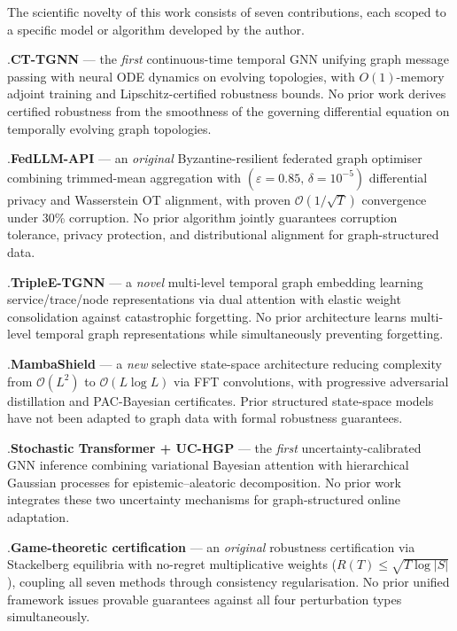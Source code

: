 The scientific novelty of this work consists of seven contributions, each scoped to a specific model or algorithm developed by the author.

.\quad \textbf{CT-TGNN} --- the \emph{first} continuous-time temporal GNN unifying graph message passing with neural ODE dynamics on evolving topologies, with $O(1)$-memory adjoint training and Lipschitz-certified robustness bounds. No prior work derives certified robustness from the smoothness of the governing differential equation on temporally evolving graph topologies.

.\quad \textbf{FedLLM-API} --- an \emph{original} Byzantine-resilient federated graph optimiser combining trimmed-mean aggregation with $(\varepsilon{=}0.85,\,\delta{=}10^{-5})$ differential privacy and Wasserstein OT alignment, with proven $\mathcal{O}(1/\sqrt{T})$ convergence under 30\% corruption. No prior algorithm jointly guarantees corruption tolerance, privacy protection, and distributional alignment for graph-structured data.

.\quad \textbf{TripleE-TGNN} --- a \emph{novel} multi-level temporal graph embedding learning service/trace/node representations via dual attention with elastic weight consolidation against catastrophic forgetting. No prior architecture learns multi-level temporal graph representations while simultaneously preventing forgetting.

.\quad \textbf{MambaShield} --- a \emph{new} selective state-space architecture reducing complexity from $\mathcal{O}(L^{2})$ to $\mathcal{O}(L\log L)$ via FFT convolutions, with progressive adversarial distillation and PAC-Bayesian certificates. Prior structured state-space models have not been adapted to graph data with formal robustness guarantees.

.\quad \textbf{Stochastic Transformer + UC-HGP} --- the \emph{first} uncertainty-calibrated GNN inference combining variational Bayesian attention with hierarchical Gaussian processes for epistemic--aleatoric decomposition. No prior work integrates these two uncertainty mechanisms for graph-structured online adaptation.

.\quad \textbf{Game-theoretic certification} --- an \emph{original} robustness certification via Stackelberg equilibria with no-regret multiplicative weights ($R(T)\!\leq\!\sqrt{T\log|S|}$), coupling all seven methods through consistency regularisation. No prior unified framework issues provable guarantees against all four perturbation types simultaneously.

